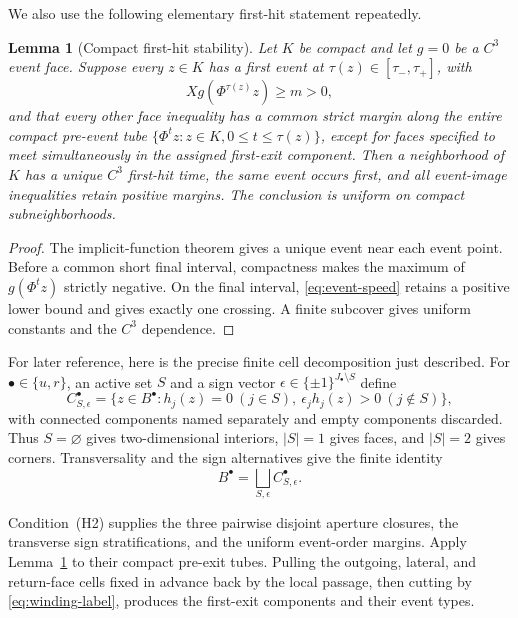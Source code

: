 \documentclass[11pt]{amsart}
\numberwithin{equation}{section}
\newtheorem{lemma}[theorem]{Lemma}
\theoremstyle{definition}
\theoremstyle{remark}
\begin{document}
We also use the following elementary first-hit statement repeatedly.

\begin{lemma}[Compact first-hit stability]\label{lem:first-hit}
Let $K$ be compact and let $g=0$ be a $C^3$ event face.  Suppose every
$z\in K$ has a first event at $\tau(z)\in[\tau_-,\tau_+]$, with
\begin{equation}\label{eq:event-speed}
 Xg(\Phi^{\tau(z)}z)\ge m>0,
\end{equation}
and that every other face inequality has a common strict margin along the
entire compact pre-event tube
$\{\Phi^tz:z\in K, 0\le t\le\tau(z)\}$, except for faces specified to meet
simultaneously in the assigned first-exit component.  Then a
neighborhood of $K$ has a unique $C^3$ first-hit time, the same event
occurs first, and all event-image inequalities retain positive margins.
The conclusion is uniform on compact subneighborhoods.
\end{lemma}

\begin{proof}
The implicit-function theorem gives a unique event near each event
point.  Before a common short final interval, compactness makes the
maximum of $g(\Phi^tz)$ strictly negative.  On the final interval,
\eqref{eq:event-speed} retains a positive lower bound and gives exactly one
crossing.  A finite subcover gives uniform constants and the $C^3$
dependence.
\end{proof}

For later reference, here is the precise finite cell decomposition just
described.  For $\bullet\in\{u,r\}$, an active set $S$ and a sign vector
$\epsilon\in\{\pm1\}^{J_\bullet\setminus S}$ define
\begin{equation}\label{eq:face-sign-strata}
 C^\bullet_{S,\epsilon}
 =\{z\in B^\bullet:h_j(z)=0\ (j\in S),\
       \epsilon_jh_j(z)>0\ (j\notin S)\},
\end{equation}
with connected components named separately and empty components discarded.
Thus $S=\varnothing$ gives two-dimensional interiors, $|S|=1$ gives faces,
and $|S|=2$ gives corners.  Transversality and the sign alternatives give
the finite identity
\begin{equation}\label{eq:finite-cell-cover}
 B^\bullet=\bigsqcup_{S,\epsilon}C^\bullet_{S,\epsilon}.
\end{equation}

Condition~\textup{(H2)} supplies the three pairwise disjoint aperture
closures, the transverse sign stratifications, and the uniform event-order
margins.  Apply Lemma~\ref{lem:first-hit} to their compact pre-exit tubes.
Pulling the
outgoing, lateral, and return-face cells fixed in advance back by the local
passage, then cutting by \eqref{eq:winding-label}, produces the first-exit
components and their event types.
\end{document}
